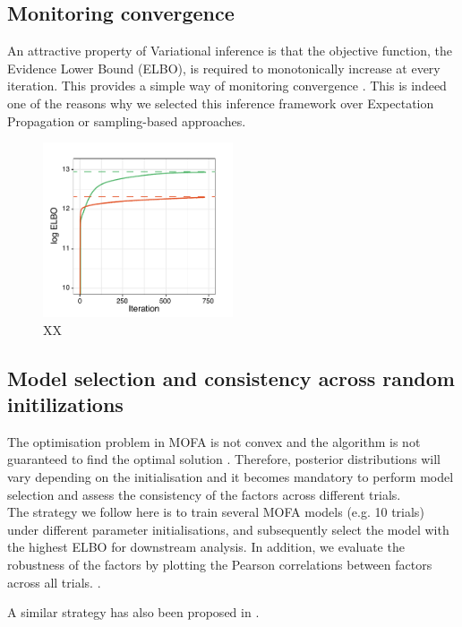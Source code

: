\subsection{Monitoring convergence}
An attractive property of Variational inference is that the objective function, the Evidence Lower Bound (ELBO), is required to monotonically increase at every iteration. This provides a simple way of monitoring convergence . This is indeed one of the reasons why we selected this inference framework over Expectation Propagation or sampling-based approaches.

 \begin{figure}[H]
	\centering 	
	\includegraphics[width=0.5\textwidth]{elbo_convergence}
	\caption{XX}
	\label{fig:elbo_convergence}
\end{figure}

\subsection{Model selection and consistency across random initilizations} \label{section:robustness}
The optimisation problem in MOFA is not convex and the algorithm is not guaranteed to find the optimal solution \cite{XX}. Therefore, posterior distributions will vary depending on the initialisation and it becomes mandatory to perform model selection and assess the consistency of the factors across different trials.\\

The strategy we follow here is to train several MOFA models (e.g. 10 trials) under different parameter initialisations, and subsequently select the model with the highest ELBO for downstream analysis. In addition, we evaluate the robustness of the factors by plotting the Pearson correlations between factors across all trials. . 

A similar strategy has also been proposed in \cite{Hore2016}.


